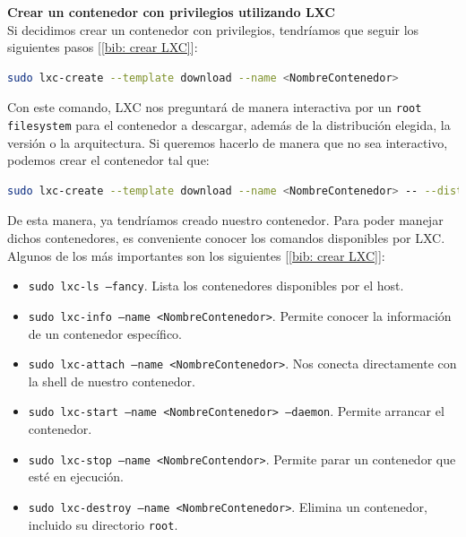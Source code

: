 \documentclass[a4paper, oneside, 12pt]{book}
\begin{document}
	\vspace{20px}

	\noindent \textbf{\large Crear un contenedor con privilegios utilizando LXC}\\
	
	\noindent Si decidimos crear un contenedor con privilegios, tendríamos que seguir los siguientes pasos [\ref{bib: crear LXC}]:
	\begin{lstlisting}[language=Bash, caption={Crear un contenedor con privilegios en LXC}]
sudo lxc-create --template download --name <NombreContenedor>
	\end{lstlisting}

	\noindent Con este comando, LXC nos preguntará de manera interactiva por un \texttt{root filesystem} para el contenedor a descargar, además de la distribución elegida, la versión o la arquitectura. Si queremos hacerlo de manera que no sea interactivo, podemos crear el contenedor tal que:
	\begin{lstlisting}[language=Bash, caption={Crear un contendor con privilegios en LXC, modo no interactivo}]
sudo lxc-create --template download --name <NombreContenedor> -- --dist debian --release stretch --arch amd64
	\end{lstlisting}

	\noindent De esta manera, ya tendríamos creado nuestro contenedor. Para poder manejar dichos contenedores, es conveniente conocer los comandos disponibles por LXC. Algunos de los más importantes son los siguientes [\ref{bib: crear LXC}]:
	\begin{itemize}
		\item \texttt{sudo lxc-ls --fancy}. Lista los contenedores disponibles por el host.
		\item \texttt{sudo lxc-info --name <NombreContenedor>}. Permite conocer la información de un contenedor específico.
		\item \texttt{sudo lxc-attach --name <NombreContenedor>}. Nos conecta directamente con la shell de nuestro contenedor.
		\item \texttt{sudo lxc-start --name <NombreContenedor> --daemon}. Permite arrancar el contenedor.
		\item \texttt{sudo lxc-stop --name <NombreContendor>}. Permite parar un contenedor que esté en ejecución.
		\item \texttt{sudo lxc-destroy --name <NombreContenedor>}. Elimina un contenedor, incluido su directorio \texttt{root}.
	\end{itemize}
	
\end{document}
